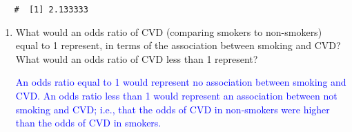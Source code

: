 \documentclass[letterpaper,12pt,twoside,]{pinp}
\begin{document}
\begin{enumerate}
\begin{Shaded}
\begin{Highlighting}[]
\OperatorTok{/}\StringTok{ }
\end{Highlighting}
\end{Shaded}

  \begin{ShadedResult}
   \begin{verbatim}
   #  [1] 2.133333
   \end{verbatim}
   \end{ShadedResult}

  \begin{enumerate}
  \def\labelenumii{\alph{enumii})}
  \setcounter{enumii}{3}
  \item
    What would an odds ratio of CVD (comparing smokers to non-smokers)
    equal to 1 represent, in terms of the association between smoking
    and CVD? What would an odds ratio of CVD less than 1 represent?

    \textcolor{blue}{An odds ratio equal to 1 would represent no association between smoking and CVD. An odds ratio less than 1 would represent an association between not smoking and CVD; i.e., that the odds of CVD in non-smokers were higher than the odds of CVD in smokers.}
  \end{enumerate}
\end{enumerate}





\end{document}
